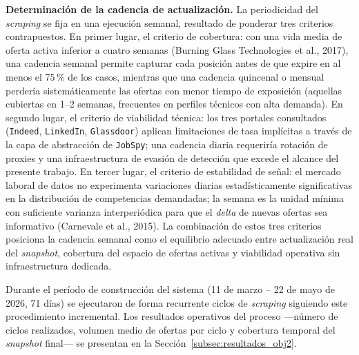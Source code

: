 \textbf{Determinación de la cadencia de actualización.} La periodicidad del \textit{scraping} se fija en una ejecución semanal, resultado de ponderar tres criterios contrapuestos. En primer lugar, el criterio de cobertura: con una vida media de oferta activa inferior a cuatro semanas (Burning Glass Technologies et al., 2017), una cadencia semanal permite capturar cada posición antes de que expire en al menos el 75\,\% de los casos, mientras que una cadencia quincenal o mensual perdería sistemáticamente las ofertas con menor tiempo de exposición (aquellas cubiertas en 1--2 semanas, frecuentes en perfiles técnicos con alta demanda). En segundo lugar, el criterio de viabilidad técnica: los tres portales consultados (\texttt{Indeed}, \texttt{LinkedIn}, \texttt{Glassdoor}) aplican limitaciones de tasa implícitas a través de la capa de abstracción de \texttt{JobSpy}; una cadencia diaria requeriría rotación de proxies y una infraestructura de evasión de detección que excede el alcance del presente trabajo. En tercer lugar, el criterio de estabilidad de señal: el mercado laboral de datos no experimenta variaciones diarias estadísticamente significativas en la distribución de competencias demandadas; la semana es la unidad mínima con suficiente varianza interperiódica para que el \textit{delta} de nuevas ofertas sea informativo (Carnevale et al., 2015). La combinación de estos tres criterios posiciona la cadencia semanal como el equilibrio adecuado entre actualización real del \textit{snapshot}, cobertura del espacio de ofertas activas y viabilidad operativa sin infraestructura dedicada.

Durante el período de construcción del sistema (11 de marzo -- 22 de mayo de 2026, 71 días) se ejecutaron de forma recurrente ciclos de \textit{scraping} siguiendo este procedimiento incremental. Los resultados operativos del proceso —número de ciclos realizados, volumen medio de ofertas por ciclo y cobertura temporal del \textit{snapshot} final— se presentan en la Sección~\ref{subsec:resultados_obj2}.

